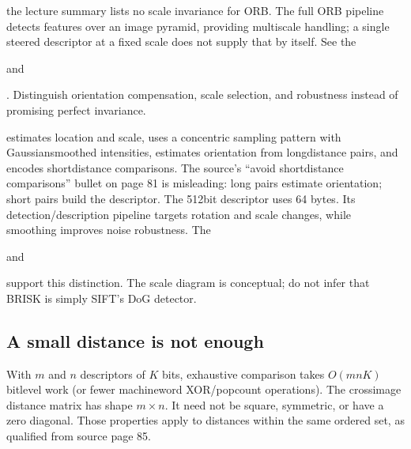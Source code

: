\documentclass[letterpaper,11pt,english,openany,oneside]{jupyterBook}
\begin{document}
\sphinxAtStartPar
{} the lecture summary lists no scale invariance for ORB. The full ORB pipeline detects features over an image pyramid, providing multiscale handling; a single steered descriptor at a fixed scale does not supply that by itself. See the %
\begin{footnote}[2]\sphinxAtStartFootnote
{}
%
\end{footnote} and %
\begin{footnote}[3]\sphinxAtStartFootnote
{}
%
\end{footnote}. Distinguish orientation compensation, scale selection, and robustness instead of promising perfect invariance.

\sphinxAtStartPar
{} estimates location and scale, uses a concentric sampling pattern with Gaussian\sphinxhyphen{}smoothed intensities, estimates orientation from long\sphinxhyphen{}distance pairs, and encodes short\sphinxhyphen{}distance comparisons. The source’s “avoid short\sphinxhyphen{}distance comparisons” bullet on page 81 is misleading: long pairs estimate orientation; short pairs build the descriptor. The 512\sphinxhyphen{}bit descriptor uses 64 bytes. Its detection/description pipeline targets rotation and scale changes, while smoothing improves noise robustness. The %
\begin{footnote}[4]\sphinxAtStartFootnote
{}
%
\end{footnote} and %
\begin{footnote}[5]\sphinxAtStartFootnote
{}
%
\end{footnote} support this distinction. The scale diagram is conceptual; do not infer that BRISK is simply SIFT’s DoG detector.


\subsection{A small distance is not enough}
\label{\detokenize{lectures/lecture05/descriptors:a-small-distance-is-not-enough}}
\sphinxAtStartPar
With \(m\) and \(n\) descriptors of \(K\) bits, exhaustive comparison takes \(O(mnK)\) bit\sphinxhyphen{}level work (or fewer machine\sphinxhyphen{}word XOR/popcount operations). The cross\sphinxhyphen{}image distance matrix has shape \(m\times n\). It need not be square, symmetric, or have a zero diagonal. Those properties apply to distances within the same ordered set, as qualified from source page 85.
\end{document}
